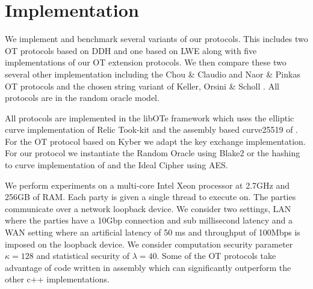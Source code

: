 \section{Implementation}\label{sec:impl}

We implement and benchmark several variants of our protocols. This includes two OT protocols based on DDH and one based on LWE along with five implementations of our OT extension protocols. We then compare these two several other implementation including the Chou \& Claudio \cite{LC:ChoOrl15} and Naor \& Pinkas \cite{SODA:NaoPin01} OT protocols and the chosen string variant of Keller, Orsini \& Scholl \cite{C:KelOrsSch15}.  All protocols are in the random oracle model.

All protocols are implemented in the libOTe framework\cite{libOTe} which uses the elliptic curve implementation of Relic Took-kit\cite{relic} and the assembly based curve25519 of \cite{LC:ChoOrl15,simplest}. For the OT protocol based on Kyber we adapt the \cite{kyber} key exchange implementation. For our protocol we instantiate the Random Oracle using Blake2 or the hashing to curve implementation of \cite{relic} and the Ideal Cipher using AES.

We perform experiments on a multi-core Intel Xeon processor at 2.7GHz and 256GB of RAM. Each party is given a single thread to execute on. The parties communicate over a network loopback device. We consider two settings, LAN where the parties have a 10Gbp connection and sub millisecond latency and a WAN setting where an artificial latency of 50 ms and throughput of 100Mbps is imposed on the loopback device. We consider computation security parameter $\kappa=128$ and statistical security of $\lambda=40$.  Some of the OT protocols take advantage of code written in assembly which can significantly outperform the other c++ implementations.
\newcommand{\mr}[2]{\multirow{#1}{*}{#2}}

